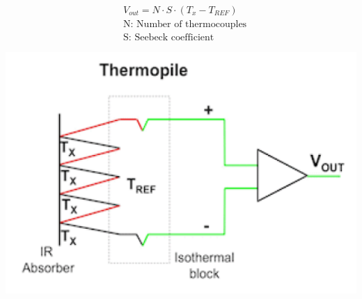 \begin{minipage}{0.45\textwidth}
       \begin{equation*} 
        \begin{split} 
          &V_{out}=N \cdot S \cdot(T_x - T_{REF})\\
          &\text{N: Number of thermocouples}\\
          &\text{S: Seebeck coefficient}
        \end{split} 
      \end{equation*}

\end{minipage}
\begin{minipage}{0.5\textwidth} 
    \vspace{-0.5cm}
    \includegraphics[width=1\textwidth]{images/Thermo}
\end{minipage}

